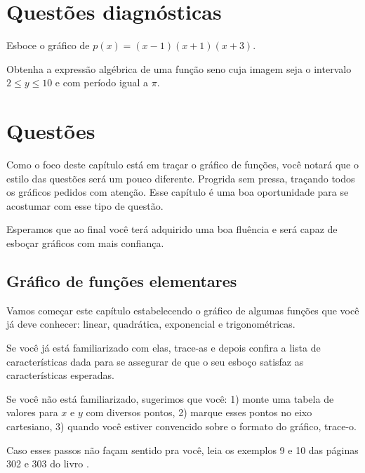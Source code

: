 \documentclass[main_estudante.tex]{subfiles}
\begin{document}
\newpage

\section{Questões diagnósticas}

\begin{diagnostico}
Esboce o gráfico de $p(x)=(x-1)(x+1)(x+3)$.
\end{diagnostico}

\vspace{4cm}

\begin{diagnostico}
Obtenha a expressão algébrica de uma função seno cuja imagem seja o intervalo $2\leq y \leq 10$ e com período igual a $\pi$.
\end{diagnostico}

\newpage

\section{Questões}

Como o foco deste capítulo está em traçar o gráfico de funções, você notará que o estilo das questões será um pouco diferente. Progrida sem pressa, traçando todos os gráficos pedidos com atenção. Esse capítulo é uma boa oportunidade para se acostumar com esse tipo de questão.

Esperamos que ao final você terá adquirido uma boa fluência e será capaz de esboçar gráficos com mais confiança.

\subsection*{Gráfico de funções elementares}

Vamos começar este capítulo estabelecendo o gráfico de algumas funções que você já deve conhecer: linear, quadrática, exponencial e trigonométricas.

Se você já está familiarizado com elas, trace-as e depois confira a lista de características dada para se assegurar de que o seu esboço satisfaz as características esperadas.

Se você não está familiarizado, sugerimos que você: 1) monte uma tabela de valores para $x$ e $y$ com diversos pontos, 2) marque esses pontos no eixo cartesiano, 3) quando você estiver convencido sobre o formato do gráfico, trace-o.

Caso esses passos não façam sentido pra você, leia os exemplos 9 e 10 das páginas 302 e 303 do livro .
\end{document}
